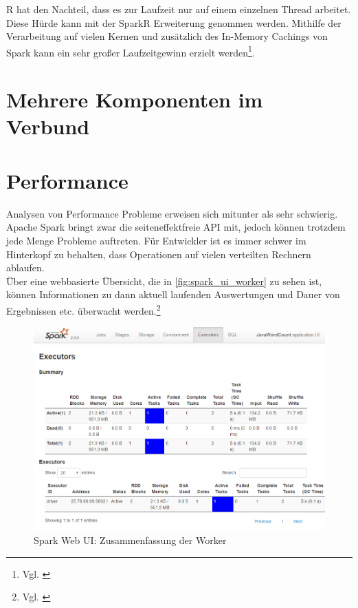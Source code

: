 \noindent
R hat den Nachteil, dass es zur Laufzeit nur auf einem einzelnen Thread arbeitet. Diese Hürde kann mit der SparkR Erweiterung genommen werden. Mithilfe der Verarbeitung auf vielen Kernen und zusätzlich des In-Memory Cachings von Spark kann ein sehr großer Laufzeitgewinn erzielt werden\footnote{Vgl. \cite{VYL+16}}.

\newpage
\section{Mehrere Komponenten im Verbund}






\newpage
\section{Performance}
Analysen von Performance Probleme erweisen sich mitunter als sehr schwierig. Apache Spark bringt zwar die seiteneffektfreie API mit, jedoch können trotzdem jede Menge Probleme auftreten. Für Entwickler ist es immer schwer im Hinterkopf zu behalten, dass Operationen auf vielen verteilten Rechnern ablaufen. \\ 

\noindent
Über eine webbasierte Übersicht, die in \autoref{fig:spark_ui_worker} zu sehen ist, können Informationen zu dann aktuell laufenden Auswertungen und Dauer von Ergebnissen etc. überwacht werden.\footnote{Vgl. \cite[12]{AAWS15}}

\begin{figure}[h]
  \centering
  \includegraphics[width=\textwidth]{./bilder/spark_ui_worker.PNG}
  \caption{Spark Web UI: Zusammenfassung der Worker}\label{fig:spark_ui_worker}
\end{figure}

